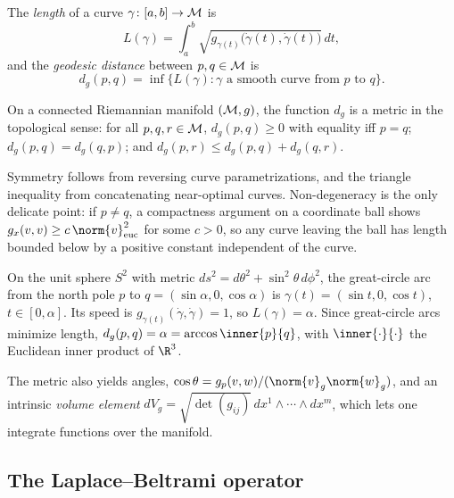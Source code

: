 \begin{definition}
\label{def:geo:distance}
The \emph{length} of a curve $\gamma \colon [a,b] \to \mathcal{M}$ is
\[
  L(\gamma) = \int_a^b \sqrt{g_{\gamma(t)}\big(\dot\gamma(t), \dot\gamma(t)\big)}\, dt ,
\]
and the \emph{geodesic distance} between $p, q \in \mathcal{M}$ is
\[
  d_g(p,q) = \inf\{ L(\gamma) : \gamma \text{ a smooth curve from } p \text{ to } q\} .
\]
\end{definition}

\begin{proposition}
\label{prop:geo:dg-metric}
On a connected Riemannian manifold $(\mathcal{M}, g)$, the function $d_g$ is a metric in
the topological sense: for all $p, q, r \in \mathcal{M}$,
$d_g(p,q) \ge 0$ with equality iff $p = q$; $d_g(p,q) = d_g(q,p)$; and
$d_g(p,r) \le d_g(p,q) + d_g(q,r)$.
\end{proposition}

Symmetry follows from reversing curve parametrizations, and the triangle
inequality from concatenating near-optimal curves. Non-degeneracy is the only
delicate point: if $p \neq q$, a compactness argument on a coordinate ball shows
$g_x(v,v) \ge c\,\norm{v}_{\mathrm{euc}}^2$ for some $c > 0$, so any curve
leaving the ball has length bounded below by a positive constant independent of
the curve.

\begin{example}
\label{ex:geo:sphere-distance}
On the unit sphere $S^2$ with metric $ds^2 = d\theta^2 + \sin^2\theta\, d\phi^2$,
the great-circle arc from the north pole $p$ to
$q = (\sin\alpha, 0, \cos\alpha)$ is $\gamma(t) = (\sin t, 0, \cos t)$,
$t \in [0,\alpha]$. Its speed is $g_{\gamma(t)}(\dot\gamma, \dot\gamma) = 1$, so
$L(\gamma) = \alpha$. Since great-circle arcs minimize length,
$d_g(p,q) = \alpha = \arccos\inner{p}{q}$, with $\inner{\cdot}{\cdot}$ the
Euclidean inner product of $\R^3$.
\end{example}

The metric also yields angles, $\cos\theta = g_p(v,w) /
(\norm{v}_g \norm{w}_g)$, and an intrinsic \emph{volume element}
$dV_g = \sqrt{\det(g_{ij})}\, dx^1 \wedge \cdots \wedge dx^m$, which lets one
integrate functions over the manifold.

\subsection{The Laplace--Beltrami operator}
\label{subsec:geo:laplacian}

